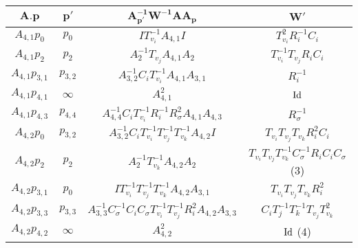\documentclass{article}[12pt]
\begin{document}
\begin{table}[h]\label{hurwitztableA4}
  \begin{center}
  {\renewcommand{\arraystretch}{1.2}%
\begin{tabular}{|c|c|c|c|}
\hline 
$\mathbf{A.p}$ & $\mathbf{p'}$ & $\mathbf{A_{p'}^{-1}W^{-1}A A_p}$ & $\mathbf{W'}$  \\
\hline

$A_{4,1} p_0$ & $p_0$ & $IT_{v_i}^{-1}A_{4,1}I$ & $T_{v_i}^2R_i^{-1}C_i$\\
\hline

$A_{4,1} p_2$ & $p_2$ & $A_2^{-1}T_{v_j}A_{4,1}A_2$& $T_{v_i}^{-1}T_{v_j}R_iC_i$\\
\hline

$A_{4,1} p_{3,1}$ & $p_{3,2}$ & $A_{3,2}^{-1}C_iT_{v_i}^{-1}A_{4,1}A_{3,1}$ & $R_i^{-1}$\\
\hline


$A_{4,1} p_{4,1}$ & $\infty$ & $A_{4,1}^2$ & ${\rm Id}$\\
\hline

$A_{4,1} p_{4,3}$ & $p_{4,4}$ & $A_{4,4}^{-1}C_iT_{v_i}^{-1}R_i^{-1}R_\sigma^2A_{4,1}A_{4,3}$ & $R_\sigma^{-1}$\\
\hline


$A_{4,2} p_0$ & $p_{3,2}$ & $A_{3,2}^{-1}C_iT_{v_i}^{-1}T_{v_j}^{-1}T_{v_k}^{-1}A_{4,2}I$ & $T_{v_i}T_{v_j}T_{v_k}R_i^2C_i $\\
\hline

$A_{4,2} p_2$ & $p_2$ & $A_2^{-1}T_{v_k}^{-1}A_{4,2}A_2$ & \hfill $T_{v_i}T_{v_j}T_{v_k}^{-1}C_\sigma^{-1}R_iC_iC_\sigma$ \hfill (3)\\
\hline

$A_{4,2} p_{3,1}$ & $p_0$ & $IT_{v_i}^{-1}T_{v_j}^{-1}T_{v_k}^{-1}A_{4,2}A_{3,1}$ & $T_{v_i}T_{v_j}T_{v_k}R_i^2$\\
\hline

$A_{4,2} p_{3,3}$ & $p_{3,3}$ & $A_{3,3}^{-1}C_\sigma^{-1}C_iC_\sigma T_{v_i}^{-1}T_{v_j}^{-1}R_i^2A_{4,2}A_{3,3}$ & $C_iT_j^{-1}T_k^{-1}T_{v_j}T_{v_k}^2$\\
\hline

$A_{4,2} p_{4,2}$ & $\infty$ & $A_{4,2}^2$ & \hfill ${\rm Id}$ \hfill (4)\\
\hline


\end{tabular}}
\end{center}
\end{table}
\end{document}
